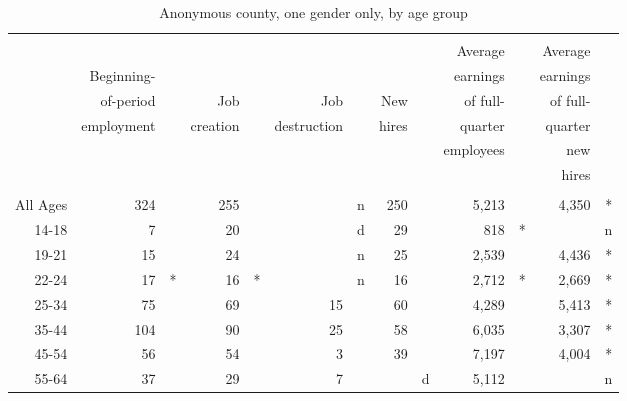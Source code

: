 
\begin{table}[htbp]
\small
\begin{center}
  \caption{Anonymous county, one gender only, by age group}
  \label{tab:table_example}
  \begin{tabular}{rrrrrrrrrrrrr}
\hline
\\[-.3cm]
        &          & &        & &           & &     & & Average & &Average & \\
        &Beginning-& &        & &           & &     & &earnings & &earnings& \\
        &of-period & &  Job   & &    Job    & & New & &of full- & &of full-& \\
        &employment& &creation& &destruction& &hires& & quarter & &quarter & \\
        &          & &        & &           & &     & &employees& &  new   & \\
        &          & &        & &           & &     & &         & & hires  & \\
\hline                                                                        \\
All Ages&       324& &     255& &           &n&  250& &    5,213& &   4,350&*\\
14-18   &         7& &      20& &           &d&   29& &      818&*&        &n\\
19-21   &        15& &      24& &           &n&   25& &    2,539& &   4,436&*\\
22-24   &        17&*&      16&*&           &n&   16& &    2,712&*&   2,669&*\\
25-34   &        75& &      69& &         15& &   60& &    4,289& &   5,413&*\\
35-44   &       104& &      90& &         25& &   58& &    6,035& &   3,307&*\\
45-54   &        56& &      54& &          3& &   39& &    7,197& &   4,004&*\\
55-64   &        37& &      29& &          7& &     &d&    5,112& &        &n\\

\end{tabular}
\end{center}
\end{table}
